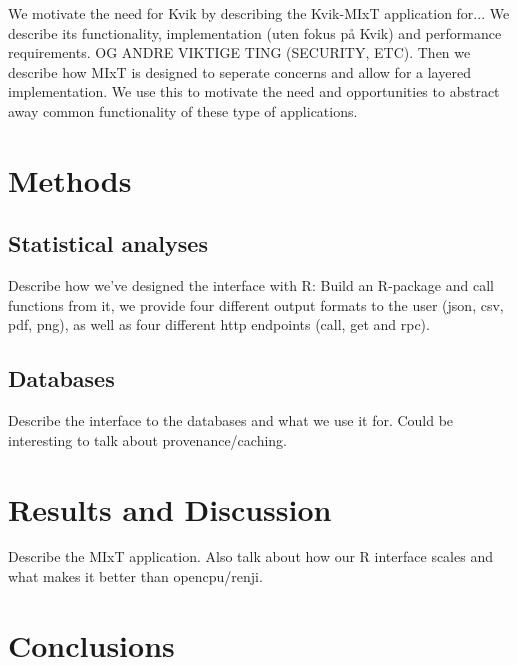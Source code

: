 We motivate the need for Kvik by describing the Kvik-MIxT application for... We
describe its functionality, implementation (uten fokus på Kvik) and performance
requirements. OG ANDRE VIKTIGE TING (SECURITY, ETC). Then we describe how MIxT
is designed to seperate concerns and allow for a layered implementation. We use
this to motivate the need and opportunities to abstract away common
functionality of these type of applications.


\section*{Methods}

\subsection*{Statistical analyses}
Describe how we've designed the interface with R: Build an R-package and call
functions from it, we provide four different output formats to the user
 (json, csv, pdf, png),  as well as four different http endpoints (call, get and
rpc).

\subsection*{Databases}
Describe the interface to the databases and what we use it for. Could be
interesting to talk about provenance/caching.



\section*{Results and Discussion}
Describe the MIxT application. Also talk about how our R interface scales and
what makes it better than opencpu/renji.



\section*{Conclusions}
